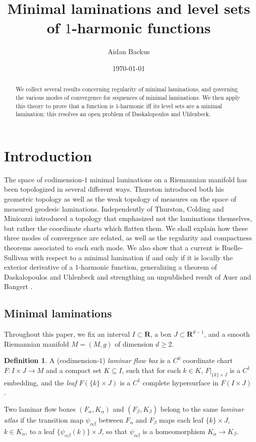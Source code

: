 \documentclass[reqno,11pt]{amsart}
\title{Minimal laminations and level sets of $1$-harmonic functions}
\author{Aidan Backus}
\date{\today}
\newcommand{\RR}{\mathbf{R}}
\newcommand{\dfn}[1]{\emph{#1}\index{#1}}
\theoremstyle{definition}
\newtheorem{definition}[theorem]{Definition}
\numberwithin{equation}{section}
\begin{document}
\begin{abstract}
We collect several results concerning regularity of minimal laminations, and governing the various modes of convergence for sequences of minimal laminations.
We then apply this theory to prove that a function is $1$-harmonic iff its level sets are a minimal lamination; this resolves an open problem of Daskalopoulos and Uhlenbeck.
\end{abstract}

\maketitle



\section{Introduction}
The space of codimension-$1$ minimal laminations on a Riemannian manifold has been topologized in several different ways.
Thurston \cite[Chapter 8]{thurston1979geometry} introduced both his geometric topology as well as the weak topology of measures on the space of measured geodesic laminations.
Independently of Thurston, Colding and Minicozzi \cite[Appendix B]{ColdingMinicozziIV} introduced a topology that emphasized not the laminations themselves, but rather the coordinate charts which flatten them.
We shall explain how these three modes of convergence are related, as well as the regularity and compactness theorems associated to each such mode.
We also show that a current is Ruelle-Sullivan with respect to a minimal lamination if and only if it is locally the exterior derivative of a $1$-harmonic function, generalizing a theorem of Daskalopoulos and Uhlenbeck \cite[Theorem 6.1]{daskalopoulos2020transverse} and strengthing an unpublished result of Auer and Bangert \cite[Theorem 1]{Auer01}.

\subsection{Minimal laminations}\label{Lams sections}
Throughout this paper, we fix an interval $I \subset \RR$, a box $J \subset \RR^{d - 1}$, and a smooth Riemannian manifold $M = (M, g)$ of dimension $d \geq 2$.

\begin{definition}
A (codimension-$1$) \dfn{laminar flow box} is a $C^0$ coordinate chart $F: I \times J \to M$ and a compact set $K \subseteq I$, such that for each $k \in K$, $F|_{\{k\} \times J}$ is a $C^1$ embedding, and the \dfn{leaf} $F(\{k\} \times J)$ is a $C^1$ complete hypersurface in $F(I \times J)$.

Two laminar flow boxes $(F_\alpha, K_\alpha)$ and $(F_\beta, K_\beta)$ belong to the same \dfn{laminar atlas} if the transition map $\psi_{\alpha \beta}$ between $F_\alpha$ and $F_\beta$ maps each leaf $\{k\} \times J$, $k \in K_\alpha$, to a leaf $\{\psi_{\alpha \beta}(k)\} \times J$, so that $\psi_{\alpha \beta}$ is a homeomorphism $K_\alpha \to K_\beta$.
\end{definition}
\end{document}
